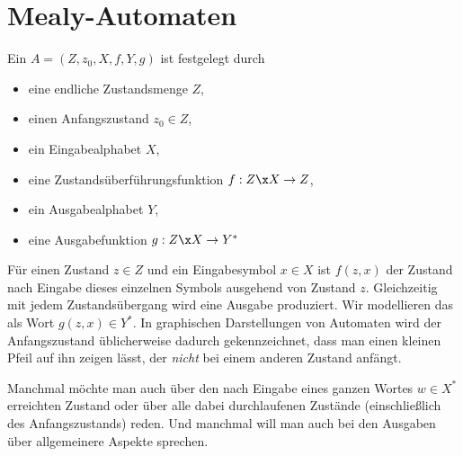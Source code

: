 

\Tut\section{Mealy-Automaten}

Ein 
$A=(Z,z_0,X,f,Y,g)$ ist festgelegt durch
\begin{itemize}
\item eine endliche Zustandsmenge $Z$,
\item einen Anfangszustand $z_0\in Z$,
\item ein Eingabealphabet $X$,
\item eine Zustandsüberführungsfunktion
   $f:Z\x X\to Z$,
\item ein Ausgabealphabet $Y$,
\item eine Ausgabefunktion  $g:Z\x X \to Y^*$
\end{itemize}
%
Für einen Zustand $z\in Z$ und ein Eingabesymbol $x\in X$ ist $f(z,x)$
der Zustand nach Eingabe dieses einzelnen Symbols ausgehend von
Zustand $z$.  Gleichzeitig mit jedem Zustandsübergang wird eine
Ausgabe produziert. Wir modellieren das als Wort $g(z,x)\in Y^*$.  In
graphischen Darstellungen von Automaten wird der Anfangszustand
üblicherweise dadurch gekennzeichnet, dass man einen kleinen Pfeil auf
ihn zeigen lässt, der \emph{nicht} bei einem anderen Zustand anfängt.


Manchmal möchte man auch über den nach Eingabe eines ganzen Wortes
$w\in X^*$ erreichten Zustand oder über alle dabei durchlaufenen
Zustände (einschließlich des Anfangszustands) reden. Und manchmal will
man auch bei den Ausgaben über allgemeinere Aspekte sprechen.

